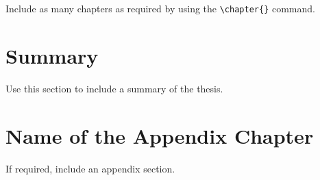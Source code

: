 \documentclass[a4paper, 12pt,  twoside,]{report}
\begin{document}
\renewcommand\thefigure{\thechapter.\arabic{figure}}    
\renewcommand{\theequation}{\thechapter.\arabic{equation}}
\setcounter{equation}{0}
\setcounter{figure}{0}

Include as many chapters as required by using the \verb!\chapter{}! command.



\clearpage

\newpage
\chapter{Summary}\label{chap:summary}

\renewcommand\thefigure{\thechapter.\arabic{figure}}    
\renewcommand{\theequation}{\thechapter.\arabic{equation}}
\setcounter{equation}{0}
\setcounter{figure}{0}

Use this section to include a summary of the thesis.


\newpage
\appendix


\chapter{Name of the Appendix Chapter}\label{app:appendix1}

\renewcommand\thefigure{\thechapter.\arabic{figure}}    
\renewcommand{\theequation}{\thechapter.\arabic{equation}}
\setcounter{equation}{0}
\setcounter{figure}{0}

If required, include an appendix section.


\clearpage

\newpage



\end{document}

